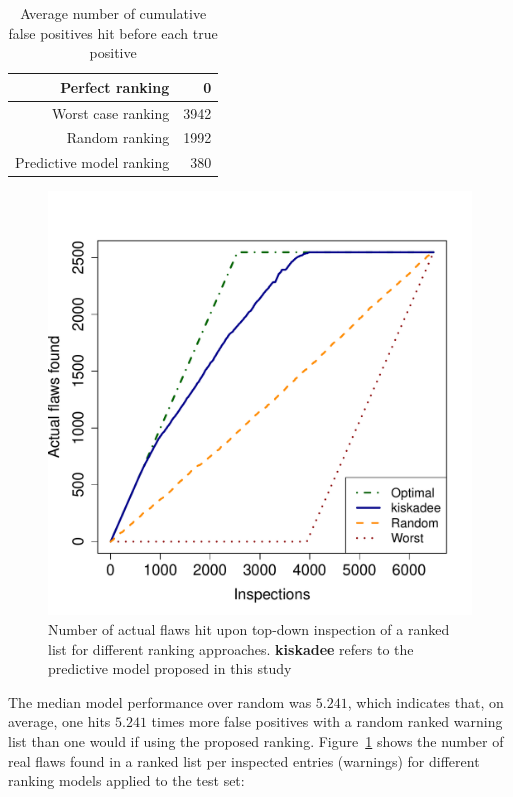   \begin{table}
    \begin{center}
        \begin{tabular}{|r|r|}
          \hline
          Perfect ranking & 0 \\
          \hline
          Worst case ranking &  3942 \\
          \hline
          Random ranking & 1992 \\
          \hline
          Predictive model ranking & 380 \\
          \hline
        \end{tabular}
        \caption{Average number of cumulative false positives hit before each true positive}\label{tab:avgfp}
    \end{center}
\end{table}


\begin{figure}
\centering
\includegraphics[width=.75\textwidth]{figures/inspections.pdf}
  \caption{Number of actual flaws hit upon top-down inspection of a ranked list for different ranking approaches. \textbf{kiskadee} refers to the predictive model proposed in this study}\label{fig:inspections}
\end{figure}

The median model performance over random was $5.241$, which indicates that, on
average, one hits $5.241$ times more false positives with a random ranked
warning list than one would if using the proposed ranking.
Figure~\ref{fig:inspections} shows the number of real flaws found in a ranked
list per inspected entries (warnings) for different ranking models applied to
the test set:

